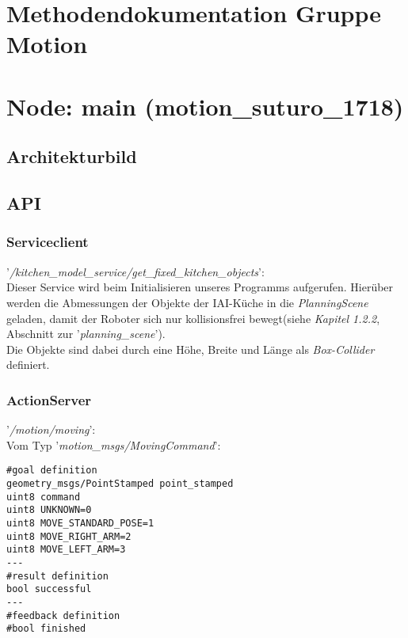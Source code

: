 \documentclass{suturo}
\begin{document}
\section*{Methodendokumentation Gruppe Motion}
\section{Node: main (motion\_suturo\_1718)}
\subsection{Architekturbild}
\begin{figure}[!htb]
\end{figure}

\subsection{API}
\subsubsection{Serviceclient}
'\textit{/kitchen\_model\_service/get\_fixed\_kitchen\_objects}': \\
Dieser Service wird beim Initialisieren unseres Programms aufgerufen. Hierüber werden die Abmessungen der Objekte der IAI-Küche in die \textit{PlanningScene} geladen, damit der Roboter sich nur kollisionsfrei bewegt(siehe \textit{Kapitel 1.2.2}, Abschnitt zur '\textit{planning\_scene}').\\
Die Objekte sind dabei durch eine Höhe, Breite und Länge als \textit{Box-Collider} definiert.


\subsubsection{ActionServer}
'\textit{/motion/moving}': \\
Vom Typ '\textit{motion\_msgs/MovingCommand}': \\
\begin{lstlisting}[caption={Definition der MovingCommandAction},captionpos=b]
#goal definition
geometry_msgs/PointStamped point_stamped
uint8 command
uint8 UNKNOWN=0
uint8 MOVE_STANDARD_POSE=1
uint8 MOVE_RIGHT_ARM=2
uint8 MOVE_LEFT_ARM=3
---
#result definition
bool successful
---
#feedback definition
#bool finished
\end{lstlisting}
\end{document}
